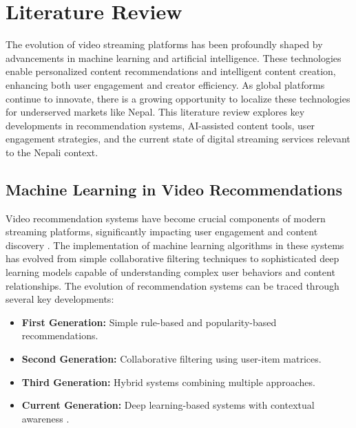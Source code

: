 \chapter{Literature Review}

The evolution of video streaming platforms has been profoundly shaped by advancements in machine learning and artificial intelligence. These technologies enable personalized content recommendations and intelligent content creation, enhancing both user engagement and creator efficiency. As global platforms continue to innovate, there is a growing opportunity to localize these technologies for underserved markets like Nepal. This literature review explores key developments in recommendation systems, AI-assisted content tools, user engagement strategies, and the current state of digital streaming services relevant to the Nepali context.

\section{Machine Learning in Video Recommendations}

Video recommendation systems have become crucial components of modern streaming platforms, significantly impacting user engagement and content discovery \cite{almabetter2023netflix, chowdhury2024ai}. The implementation of machine learning algorithms in these systems has evolved from simple collaborative filtering techniques to sophisticated deep learning models capable of understanding complex user behaviors \cite{song2025netflix, ingrade2025youtube} and content relationships. The evolution of recommendation systems can be traced through several key developments:

\begin{itemize}[leftmargin=2cm]
  \item \textbf{First Generation:} Simple rule-based and popularity-based recommendations.
  \item \textbf{Second Generation:} Collaborative filtering using user-item matrices.
  \item \textbf{Third Generation:} Hybrid systems combining multiple approaches.
  \item \textbf{Current Generation:} Deep learning-based systems with contextual awareness \cite{chowdhury2024ai}.
\end{itemize}

